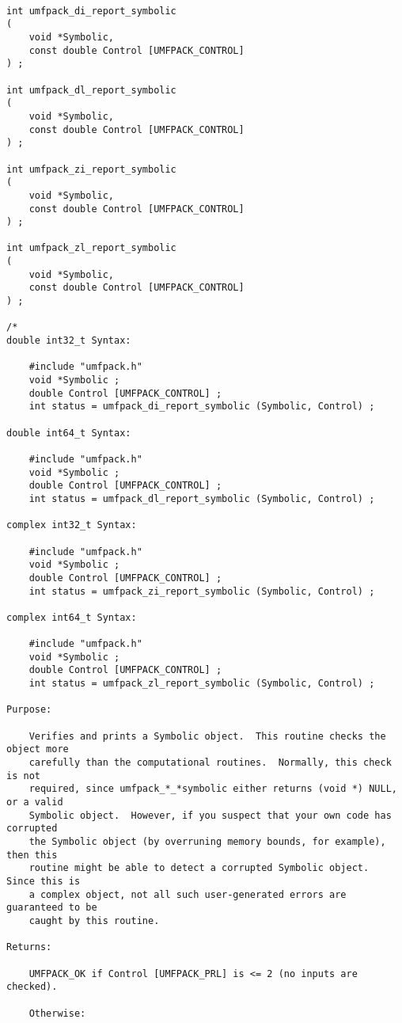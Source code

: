\documentclass[11pt]{article}
\begin{document}
{\footnotesize
\begin{verbatim}

int umfpack_di_report_symbolic
(
    void *Symbolic,
    const double Control [UMFPACK_CONTROL]
) ;

int umfpack_dl_report_symbolic
(
    void *Symbolic,
    const double Control [UMFPACK_CONTROL]
) ;

int umfpack_zi_report_symbolic
(
    void *Symbolic,
    const double Control [UMFPACK_CONTROL]
) ;

int umfpack_zl_report_symbolic
(
    void *Symbolic,
    const double Control [UMFPACK_CONTROL]
) ;

/*
double int32_t Syntax:

    #include "umfpack.h"
    void *Symbolic ;
    double Control [UMFPACK_CONTROL] ;
    int status = umfpack_di_report_symbolic (Symbolic, Control) ;

double int64_t Syntax:

    #include "umfpack.h"
    void *Symbolic ;
    double Control [UMFPACK_CONTROL] ;
    int status = umfpack_dl_report_symbolic (Symbolic, Control) ;

complex int32_t Syntax:

    #include "umfpack.h"
    void *Symbolic ;
    double Control [UMFPACK_CONTROL] ;
    int status = umfpack_zi_report_symbolic (Symbolic, Control) ;

complex int64_t Syntax:

    #include "umfpack.h"
    void *Symbolic ;
    double Control [UMFPACK_CONTROL] ;
    int status = umfpack_zl_report_symbolic (Symbolic, Control) ;

Purpose:

    Verifies and prints a Symbolic object.  This routine checks the object more
    carefully than the computational routines.  Normally, this check is not
    required, since umfpack_*_*symbolic either returns (void *) NULL, or a valid
    Symbolic object.  However, if you suspect that your own code has corrupted
    the Symbolic object (by overruning memory bounds, for example), then this
    routine might be able to detect a corrupted Symbolic object.  Since this is
    a complex object, not all such user-generated errors are guaranteed to be
    caught by this routine.

Returns:

    UMFPACK_OK if Control [UMFPACK_PRL] is <= 2 (no inputs are checked).

    Otherwise:


\end{verbatim}}
\end{document}
